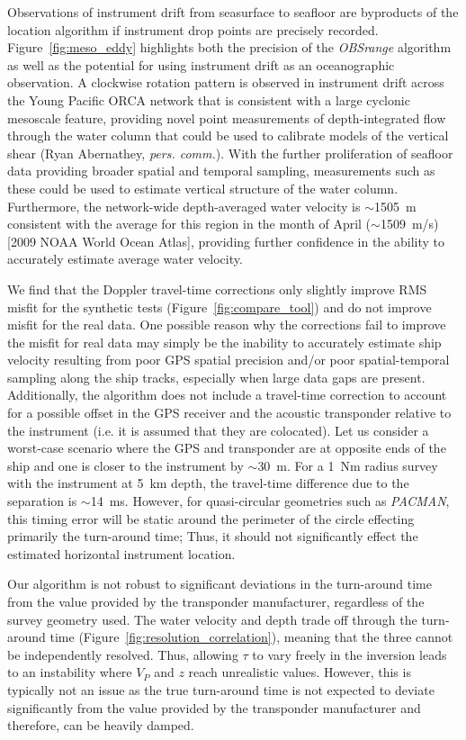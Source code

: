 Observations of instrument drift from seasurface to seafloor are byproducts of the location algorithm if instrument drop points are precisely recorded. Figure~\ref{fig:meso_eddy} highlights both the precision of the \textit{OBSrange} algorithm as well as the potential for using instrument drift as an oceanographic observation. A clockwise rotation pattern is observed in instrument drift across the Young Pacific ORCA network that is consistent with a large cyclonic mesoscale feature, providing novel point measurements of depth-integrated flow through the water column that could be used to calibrate models of the vertical shear (Ryan Abernathey, \textit{pers. comm.}). With the further proliferation of seafloor data providing broader spatial and temporal sampling, measurements such as these could be used to estimate vertical structure of the water column. Furthermore, the network-wide depth-averaged water velocity is $\sim$1505~m consistent with the average for this region in the month of April ($\sim$1509~m/s) [2009 NOAA World Ocean Atlas], providing further confidence in the ability to accurately estimate average water velocity.

We find that the Doppler travel-time corrections only slightly improve RMS misfit for the synthetic tests (Figure~\ref{fig:compare_tool}) and do not improve misfit for the real data. One possible reason why the corrections fail to improve the misfit for real data may simply be the inability to accurately estimate ship velocity resulting from poor GPS spatial precision and/or poor spatial-temporal sampling along the ship tracks, especially when large data gaps are present. Additionally, the algorithm does not include a travel-time correction to account for a possible offset in the GPS receiver and the acoustic transponder relative to the instrument (i.e. it is assumed that they are colocated). Let us consider a worst-case scenario where the GPS and transponder are at opposite ends of the ship and one is closer to the instrument by $\sim$30~m. For a 1~Nm radius survey with the instrument at 5~km depth, the travel-time difference due to the separation is $\sim$14~ms. However, for quasi-circular geometries such as \textit{PACMAN}, this timing error will be static around the perimeter of the circle effecting primarily the turn-around time; Thus, it should not significantly effect the estimated horizontal instrument location.

Our algorithm is not robust to significant deviations in the turn-around time from the value provided by the transponder manufacturer, regardless of the survey geometry used. The water velocity and depth trade off through the turn-around time (Figure~\ref{fig:resolution_correlation}), meaning that the three cannot be independently resolved. Thus, allowing $\tau$ to vary freely in the inversion leads to an instability where $V_P$ and $z$ reach unrealistic values. However, this is typically not an issue as the true turn-around time is not expected to deviate significantly from the value provided by the transponder manufacturer and therefore, can be heavily damped.
